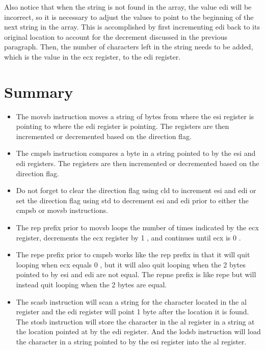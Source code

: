 \documentclass[10pt]{book}
\begin{document}
Also notice that when the string is not found in the array, the value edi will be incorrect, so it is necessary to adjust the values to point to the beginning of the next string in the array. This is accomplished by first incrementing edi back to its original location to account for the decrement discussed in the previous paragraph. Then, the number of characters left in the string needs to be added, which is the value in the ecx register, to the edi register.

\section{Summary}
\begin{itemize}
  \item The movsb instruction moves a string of bytes from where the esi register is pointing to where the edi register is pointing. The registers are then incremented or decremented based on the direction flag.
  \item The cmpsb instruction compares a byte in a string pointed to by the esi and edi registers. The registers are then incremented or decremented based on the direction flag.
  \item Do not forget to clear the direction flag using cld to increment esi and edi or set the direction flag using std to decrement esi and edi prior to either the cmpsb or movsb instructions.
  \item The rep prefix prior to movsb loops the number of times indicated by the ecx register, decrements the ecx register by 1 , and continues until ecx is 0 .
  \item The repe prefix prior to cmpsb works like the rep prefix in that it will quit looping when ecx equals 0 , but it will also quit looping when the 2 bytes pointed to by esi and edi are not equal. The repne prefix is like repe but will instead quit looping when the 2 bytes are equal.
  \item The scasb instruction will scan a string for the character located in the al register and the edi register will point 1 byte after the location it is found. The stosb instruction will store the character in the al register in a string at the location pointed at by the edi register. And the lodsb instruction will load the character in a string pointed to by the esi register into the al register.
\end{itemize}
\end{document}
